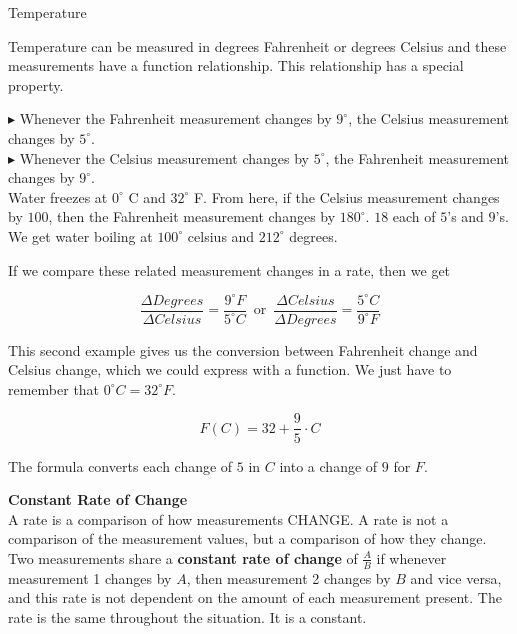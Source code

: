 \documentclass{ximera}
\begin{document}
\begin{example} Temperature


Temperature can be measured in degrees Fahrenheit or degrees Celsius and these measurements have a function relationship. This relationship has a special property.


$\blacktriangleright$ Whenever the Fahrenheit measurement changes by $9^{\circ}$, the Celsius measurement changes by $5^{\circ}$. \\
$\blacktriangleright$ Whenever the Celsius measurement changes by $5^{\circ}$, the Fahrenheit measurement changes by $9^{\circ}$. \\



Water freezes at $0^{\circ}$ C and $32^{\circ}$ F.  From here, if the Celsius measurement changes by $100$, then the Fahrenheit measurement changes by $180^{\circ}$.  $18$ each of $5$'s and $9$'s. We get water boiling at $100^{\circ}$ celsius and $212^{\circ}$ degrees.


If we compare these related measurement changes in a rate, then we get

\[
\frac{\Delta Degrees}{\Delta Celsius} = \frac{9^{\circ}F}{5^{\circ}C} \, \text{ or } \, \frac{\Delta Celsius}{\Delta Degrees} = \frac{5^{\circ}C}{9^{\circ}F}
\]


\end{example} 


This second example gives us the conversion between Fahrenheit change and Celsius change, which we could express with a function.  We just have to remember that $0^{\circ}C = 32^{\circ}F$.

\[
F(C) = 32 + \frac{9}{5} \cdot C
\]


The formula converts each change of $5$ in $C$ into a change of $9$ for $F$.







\begin{definition} \textbf{\textcolor{green!50!black}{Constant Rate of Change}} \\


A rate is a comparison of how measurements CHANGE. A rate is not a comparison of the measurement values, but a comparison of how they change. \\


Two measurements share a \textbf{constant rate of change} of $\tfrac{A}{B}$ if whenever measurement 1 changes by $A$, then measurement 2 changes by $B$ and vice versa, and this rate is not dependent on the amount of each measurement present.  The rate is the same throughout the situation.  It is a constant.




\end{definition}
\end{document}
